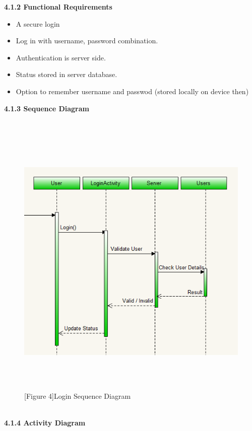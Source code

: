 \documentclass[29pt,a4paper]{moderncv}
\begin{document}
		\noindent\textbf{4.1.2 Functional Requirements}
			\begin{itemize}
				\item A secure login
				\item Log in with username, password combination.
				\item Authentication is server side.
				\item Status stored in server database.
				\item Option to remember username and passwod (stored locally on device then)\\			
			\end{itemize}
			
\newpage	
			\left\textbf{4.1.3 Sequence Diagram}\\
			\\ \begin{figure}
				\centering
			\\	\includegraphics[width=5.5in, height=5.0in]{./loginActivity1.png}
				\\\caption{[Figure 4]Login Sequence Diagram}
			\end{figure}	\\
\newpage
			\left\textbf{4.1.4 Activity Diagram}\\
\end{document}
